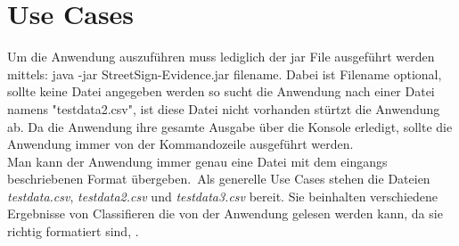 \chapter{Use Cases}
Um die Anwendung auszuführen muss lediglich der jar File ausgeführt werden mittels:
java -jar StreetSign-Evidence.jar filename. Dabei ist Filename optional, sollte keine Datei
angegeben werden so sucht die Anwendung nach einer Datei namens "testdata2.csv", ist diese
Datei nicht vorhanden stürtzt die Anwendung ab.
Da die Anwendung ihre gesamte Ausgabe über die Konsole erledigt, sollte die Anwendung immer von
der Kommandozeile ausgeführt werden.\\
Man kann der Anwendung immer genau eine Datei mit dem eingangs beschriebenen Format übergeben.\
Als generelle Use Cases stehen die Dateien \textit{testdata.csv}, \textit{testdata2.csv} und \textit{testdata3.csv} bereit.
Sie beinhalten verschiedene Ergebnisse von Classifieren die von der Anwendung gelesen werden kann, da sie richtig formatiert sind, .

